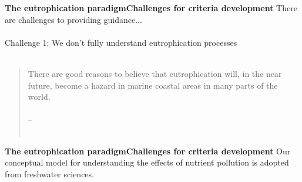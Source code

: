 \documentclass[serif]{beamer}\usepackage[]{graphicx}\usepackage[]{color}
\begin{document}
\begin{frame}{\textbf{The eutrophication paradigm}}{\textbf{Challenges for criteria development}}
\onslide<+->
There are challenges to providing guidance...\\~\\
\alert{Challenge 1:} We don't fully understand eutrophication processes \\~\\
\begin{quote}
There are good reasons to believe that eutrophication will, in the near \alert{future}, become a \alert{hazard in marine coastal areas} in many parts of the world.\\~\\
\vspace{0.05in}
\hfill -- \cite{Rosenberg85} \\~\\
\end{quote}
\end{frame}

\begin{frame}{\textbf{The eutrophication paradigm}}{\textbf{Challenges for criteria development}}
\onslide<+->
Our conceptual model for understanding the effects of nutrient pollution is adopted from freshwater sciences. \\~\\
\begin{center}
\end{center}
\vspace{-0.5cm}\hspace*{15pt}\\~\\
\end{frame}
\end{document}

